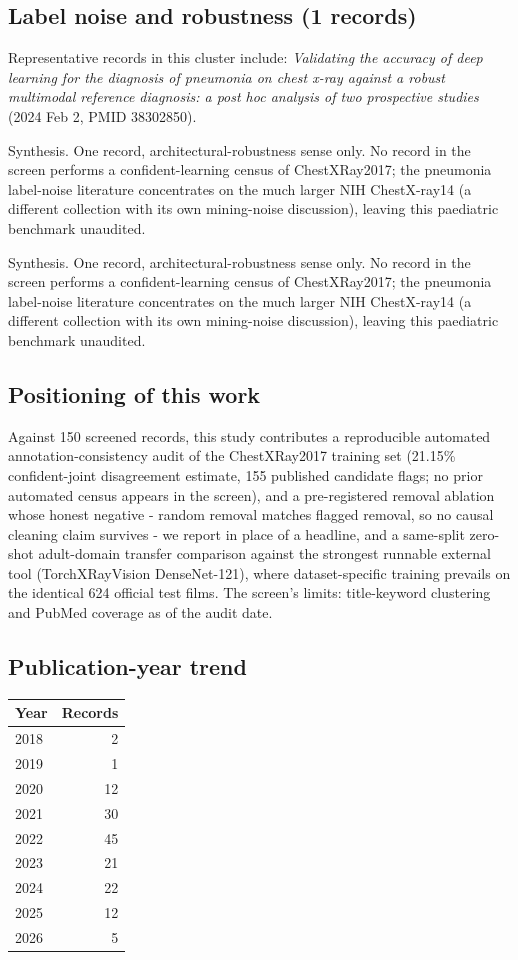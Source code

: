 \subsection*{Label noise and robustness (1 records)}
Representative records in this cluster include: \emph{Validating the accuracy of deep learning for the diagnosis of pneumonia on chest x-ray against a robust multimodal reference diagnosis: a post hoc analysis of two prospective studies} (2024 Feb 2, PMID 38302850).\par

Synthesis. One record, architectural-robustness sense only. No record in the screen performs a confident-learning census of ChestXRay2017; the pneumonia label-noise literature concentrates on the much larger NIH ChestX-ray14 (a different collection with its own mining-noise discussion), leaving this paediatric benchmark unaudited.


Synthesis. One record, architectural-robustness sense only. No record in the screen performs a confident-learning census of ChestXRay2017; the pneumonia label-noise literature concentrates on the much larger NIH ChestX-ray14 (a different collection with its own mining-noise discussion), leaving this paediatric benchmark unaudited.


\subsection*{Positioning of this work}
Against 150 screened records, this study contributes a reproducible automated annotation-consistency audit of the ChestXRay2017 training set (21.15\% confident-joint disagreement estimate, 155 published candidate flags; no prior automated census appears in the screen), and a pre-registered removal ablation whose honest negative - random removal matches flagged removal, so no causal cleaning claim survives - we report in place of a headline, and a same-split zero-shot adult-domain transfer comparison against the strongest runnable external tool (TorchXRayVision DenseNet-121), where dataset-specific training prevails on the identical 624 official test films. The screen's limits: title-keyword clustering and PubMed coverage as of the audit date.

\subsection*{Publication-year trend}
\begin{tabular}{lr}
\hline
Year & Records \\
\hline
2018 & 2 \\
2019 & 1 \\
2020 & 12 \\
2021 & 30 \\
2022 & 45 \\
2023 & 21 \\
2024 & 22 \\
2025 & 12 \\
2026 & 5 \\
\hline
\end{tabular}

